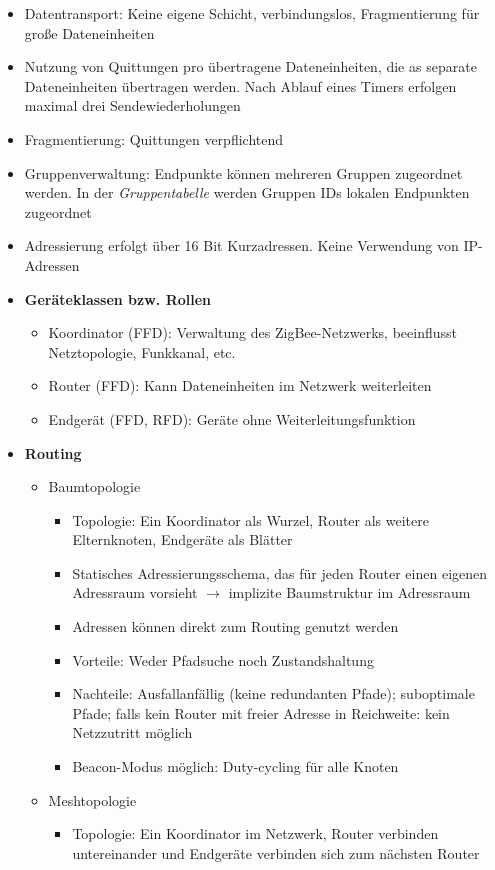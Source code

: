 \begin{itemize}
\begin{itemize}
		\item Datentransport: Keine eigene Schicht, verbindungslos, Fragmentierung für große Dateneinheiten
		\item Nutzung von Quittungen pro übertragene Dateneinheiten, die as separate Dateneinheiten übertragen werden. Nach Ablauf eines Timers erfolgen maximal drei Sendewiederholungen
		\item Fragmentierung: Quittungen verpflichtend
		\item Gruppenverwaltung: Endpunkte können mehreren Gruppen zugeordnet werden. In der \textit{Gruppentabelle} werden Gruppen IDs lokalen Endpunkten zugeordnet
		\item Adressierung erfolgt über 16 Bit Kurzadressen. Keine Verwendung von IP-Adressen
		\item \textbf{Geräteklassen bzw. Rollen}
		\begin{itemize}
			\item Koordinator (FFD): Verwaltung des ZigBee-Netzwerks, beeinflusst Netztopologie, Funkkanal, etc.
			\item Router (FFD): Kann Dateneinheiten im Netzwerk weiterleiten
			\item Endgerät (FFD, RFD): Geräte ohne Weiterleitungsfunktion
		\end{itemize}
		\item \textbf{Routing}
		\begin{itemize}
			\item Baumtopologie
			\begin{itemize}
				\item Topologie: Ein Koordinator als Wurzel, Router als weitere Elternknoten, Endgeräte als Blätter
				\item Statisches Adressierungsschema, das für jeden Router einen eigenen Adressraum vorsieht \(\rightarrow\) implizite Baumstruktur im Adressraum
				\item Adressen können direkt zum Routing genutzt werden
				\item Vorteile: Weder Pfadsuche noch Zustandshaltung
				\item Nachteile: Ausfallanfällig (keine redundanten Pfade); suboptimale Pfade; falls kein Router mit freier Adresse in Reichweite: kein Netzzutritt möglich
				\item Beacon-Modus möglich: Duty-cycling für alle Knoten
			\end{itemize}
			\item Meshtopologie
			\begin{itemize}
				\item Topologie: Ein Koordinator im Netzwerk, Router verbinden untereinander und Endgeräte verbinden sich zum nächsten Router

\end{itemize}
\end{itemize}
\end{itemize}
\end{itemize}
